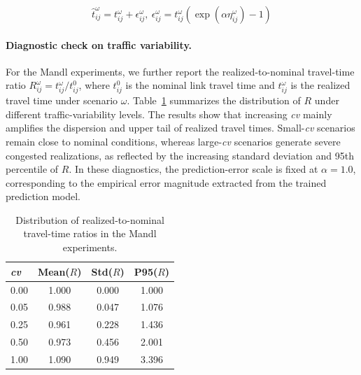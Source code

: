 \begin{equation}
\hat t_{ij}^{\omega} = t_{ij}^{\omega}
+
\epsilon_{ij}^{\omega}, \
%
\epsilon_{ij}^{\omega} =
t_{ij}^{\omega}
\left(
\exp\!\left(\alpha\eta_{ij}^{\omega}\right)-1
\right)
\label{eq:predTRAVEL_appendix}
\end{equation}



\paragraph{Diagnostic check on traffic variability.}
For the Mandl experiments, we further report the realized-to-nominal travel-time ratio
$R_{ij}^{\omega}=t_{ij}^{\omega}/t_{ij}^{0}$, where $t_{ij}^{0}$ is the nominal link travel time and $t_{ij}^{\omega}$ is the realized travel time under scenario $\omega$. Table~\ref{tab:travel_time_ratio} summarizes the distribution of $R$ under different traffic-variability levels. The results show that increasing \textit{cv} mainly amplifies the dispersion and upper tail of realized travel times. Small-\textit{cv} scenarios remain close to nominal conditions, whereas large-\textit{cv} scenarios generate severe congested realizations, as reflected by the increasing standard deviation and 95th percentile of $R$. In these diagnostics, the prediction-error scale is fixed at $\alpha=1.0$, corresponding to the empirical error magnitude extracted from the trained prediction model.

\begin{table}[htbp!]
\centering
\caption{Distribution of realized-to-nominal travel-time ratios in the Mandl experiments.}
\label{tab:travel_time_ratio}
\begin{tabular}{lccc}
\hline
\textit{cv} & Mean($R$) & Std($R$) & P95($R$) \\
\hline
0.00 & 1.000 & 0.000 & 1.000 \\
0.05 & 0.988 & 0.047 & 1.076 \\
0.25 & 0.961 & 0.228 & 1.436 \\
0.50 & 0.973 & 0.456 & 2.001 \\
1.00 & 1.090 & 0.949 & 3.396 \\
\hline
\end{tabular}
\end{table}



